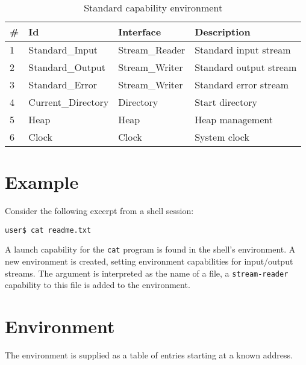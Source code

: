 \begin{table}[ht]
\begin{tabular}{l l l l}
\hline\hline
\# & Id & Interface & Description \\
\hline
1 & Standard\_Input & Stream\_Reader & Standard input stream \\
2 & Standard\_Output & Stream\_Writer & Standard output stream \\
3 & Standard\_Error & Stream\_Writer & Standard error stream \\
4 & Current\_Directory & Directory & Start directory \\
5 & Heap & Heap & Heap management \\
6 & Clock & Clock & System clock \\
\hline
\end{tabular}
\caption{Standard capability environment}
\label{table:standard-cap-env}
\end{table}

\section{Example}

Consider the following excerpt from a shell session:

{\tt user\$ cat readme.txt }

A launch capability for the {\tt cat} program is found in the shell's environment.  A new environment is created, setting environment capabilities for input/output streams.  The argument is interpreted as the name of a file, a {\tt stream-reader} capability to this file is added to the environment.

\section{Environment}

The environment is supplied as a table of entries starting at a known address.

